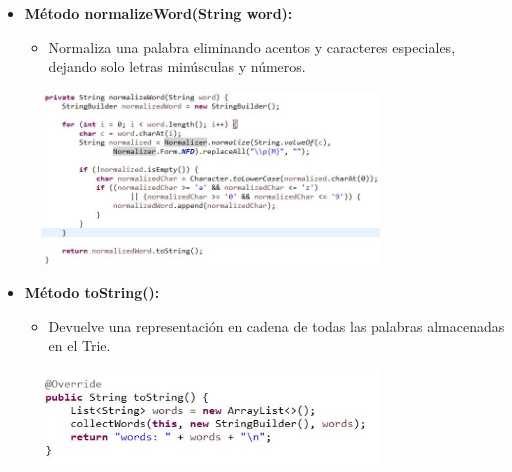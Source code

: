 \documentclass{article}
\begin{document}
	\begin{itemize}
	\item \textbf{Método normalizeWord(String word):}
	 \begin{itemize}
	 \item Normaliza una palabra eliminando acentos y caracteres especiales, dejando solo letras minúsculas y números.
	 \end{itemize}
	\end{itemize}
	 \begin{figure}[H]
		\centering
		\includegraphics[width=0.8\textwidth,keepaspectratio]{img/TN5.jpg}
	\end{figure}
	\clearpage
	
	\begin{itemize}
	\item \textbf{Método toString():}
	 \begin{itemize}
	 \item Devuelve una representación en cadena de todas las palabras almacenadas en el Trie.
	 \end{itemize}
	\end{itemize}
	 \begin{figure}[H]
		\centering
		\includegraphics[width=0.8\textwidth,keepaspectratio]{img/TN6.jpg}
	\end{figure}
	
\end{document}
